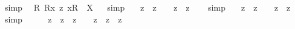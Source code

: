 \begin{isabellebody}
\ simp\ \isamarkupfalse%
%
\endisatagproof
{\isafoldproof}%
%
\isadelimproof
%
\endisadelimproof
\isanewline
{}\isamarkupfalse%
\ {\isachardoublequoteopen}{\isasymforall}{\isacharparenleft}{\isasymlambda}R{\isachardot}\ {\isacharless}{\isachardot}R{\isachardot}{\isasymbullet}{\isachardot}x{\isachardot}{\isachargreater}\ {\isasymrightarrow}\isactrlsup z\ {\isacharless}{\isachardot}x{\isachardot}{\isasymcirc}{\isachardot}R{\isachardot}{\isachargreater}{\isacharparenright}\ {\isacharequal}\ X{\isachardoublequoteclose}%
\isadelimproof
\ %
\endisadelimproof
%
\isatagproof
{}\isamarkupfalse%
\ simp\ \isamarkupfalse%
%
\endisatagproof
{\isafoldproof}%
%
\isadelimproof
%
\endisadelimproof
%
\isamarkuptrue%
\isamarkupfalse%
\ {\isachardoublequoteopen}{\isacharcomma}{\isasymphi}{\isacharcomma}\ {\isasymand}\isactrlsup z\ {\isacharcomma}{\isasympsi}{\isacharcomma}\ {\isasymrightarrow}\isactrlsup z\ {\isacharcomma}{\isasymchi}{\isacharcomma}\ {\isasymequiv}\ {\isacharparenleft}{\isacharcomma}{\isasymphi}{\isacharcomma}\ {\isasymand}\isactrlsup z\ {\isacharcomma}{\isasympsi}{\isacharcomma}{\isacharparenright}\ {\isasymrightarrow}\isactrlsup z\ {\isacharcomma}{\isasymchi}{\isacharcomma}{\isachardoublequoteclose}%
\isadelimproof
\ %
\endisadelimproof
%
\isatagproof
{}\isamarkupfalse%
\ simp\ \isamarkupfalse%
%
\endisatagproof
{\isafoldproof}%
%
\isadelimproof
%
\endisadelimproof
\isanewline
{}\isamarkupfalse%
\ {\isachardoublequoteopen}{\isacharcomma}{\isasymphi}{\isacharcomma}\ {\isasymand}\isactrlsup z\ {\isacharcomma}{\isasympsi}{\isacharcomma}\ {\isasymrightarrow}\isactrlsup z\ {\isacharcomma}{\isasymchi}{\isacharcomma}\ {\isasymequiv}\ {\isacharcomma}{\isasymphi}{\isacharcomma}\ {\isasymand}\isactrlsup z\ {\isacharparenleft}{\isacharcomma}{\isasympsi}{\isacharcomma}\ {\isasymrightarrow}\isactrlsup z\ {\isacharcomma}{\isasymchi}{\isacharcomma}{\isacharparenright}{\isachardoublequoteclose}%
\isadelimproof
\ %
\endisadelimproof
%
\isatagproof
{}\isamarkupfalse%
\ simp%
\endisatagproof
{\isafoldproof}%
%
\isadelimproof
%
\endisadelimproof
\ \isamarkupfalse%
%
\isadelimproof
\ %
\endisadelimproof
%
\isatagproof
{}\isamarkupfalse%
%
\endisatagproof
{\isafoldproof}%
%
\isadelimproof
%
\endisadelimproof
\isanewline
\isanewline
{}\isamarkupfalse%
\ {\isachardoublequoteopen}{\isacharparenleft}{\isacharcomma}{\isasymphi}{\isacharcomma}\ {\isasymand}\isactrlsup z\ {\isacharcomma}{\isasympsi}{\isacharcomma}\ {\isasymequiv}\isactrlsup z\ {\isacharcomma}{\isasymphi}{\isacharcomma}\ {\isasymand}\isactrlsup z\ {\isacharcomma}{\isasympsi}{\isacharcomma}{\isacharparenright}\ {\isasymequiv}\ {\isacharparenleft}{\isacharparenleft}{\isacharcomma}{\isasymphi}{\isacharcomma}\ {\isasymand}\isactrlsup z\ {\isacharcomma}{\isasympsi}{\isacharcomma}{\isacharparenright}\ {\isasymequiv}\isactrlsup z\ {\isacharparenleft}{\isacharcomma}{\isasymphi}{\isacharcomma}\ {\isasymand}\isactrlsup z\ {\isacharcomma}{\isasympsi}{\isacharcomma}{\isacharparenright}{\isacharparenright}{\isachardoublequoteclose}%

\end{isabellebody}
